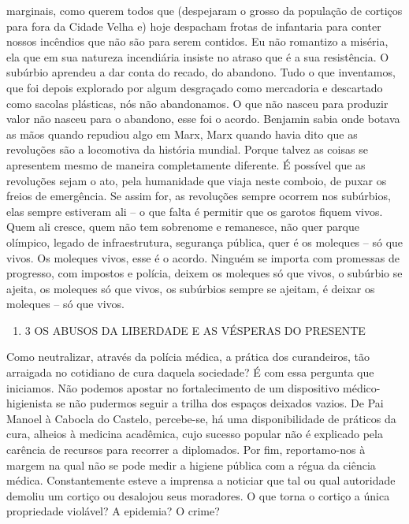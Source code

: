marginais, como querem todos que (despejaram o grosso da população de
cortiços para fora da Cidade Velha e) hoje despacham frotas de
infantaria para conter nossos incêndios que não são para serem contidos.
Eu não romantizo a miséria, ela que em sua natureza incendiária insiste
no atraso que é a sua resistência. O subúrbio aprendeu a dar conta do
recado, do abandono. Tudo o que inventamos, que foi depois explorado por
algum desgraçado como mercadoria e descartado como sacolas plásticas,
nós não abandonamos. O que não nasceu para produzir valor não nasceu
para o abandono, esse foi o acordo. Benjamin sabia onde botava as mãos
quando repudiou algo em Marx, Marx quando havia dito que as revoluções
são a locomotiva da história mundial. Porque talvez as coisas se
apresentem mesmo de maneira completamente diferente. É possível que as
revoluções sejam o ato, pela humanidade que viaja neste comboio, de
puxar os freios de emergência. Se assim for, as revoluções sempre
ocorrem nos subúrbios, elas sempre estiveram ali -- o que falta é
permitir que os garotos fiquem vivos. Quem ali cresce, quem não tem
sobrenome e remanesce, não quer parque olímpico, legado de
infraestrutura, segurança pública, quer é os moleques -- só que vivos.
Os moleques vivos, esse é o acordo. Ninguém se importa com promessas de
progresso, com impostos e polícia, deixem os moleques só que vivos, o
subúrbio se ajeita, os moleques só que vivos, os subúrbios sempre se
ajeitam, é deixar os moleques -- só que vivos.

\begin{enumerate}
\def\labelenumi{\arabic{enumi}.}
\setcounter{enumi}{4}
\tightlist
\item
  3 OS ABUSOS DA LIBERDADE E AS VÉSPERAS DO PRESENTE
\end{enumerate}

Como neutralizar, através da polícia médica, a prática dos curandeiros,
tão arraigada no cotidiano de cura daquela sociedade? É com essa
pergunta que iniciamos. Não podemos apostar no fortalecimento de um
dispositivo médico-higienista se não pudermos seguir a trilha dos
espaços deixados vazios. De Pai Manoel à Cabocla do Castelo, percebe-se,
há uma disponibilidade de práticos da cura, alheios à medicina
acadêmica, cujo sucesso popular não é explicado pela carência de
recursos para recorrer a diplomados. Por fim, reportamo-nos à margem na
qual não se pode medir a higiene pública com a régua da ciência médica.
Constantemente esteve a imprensa a noticiar que tal ou qual autoridade
demoliu um cortiço ou desalojou seus moradores. O que torna o cortiço a
única propriedade violável? A epidemia? O crime?

